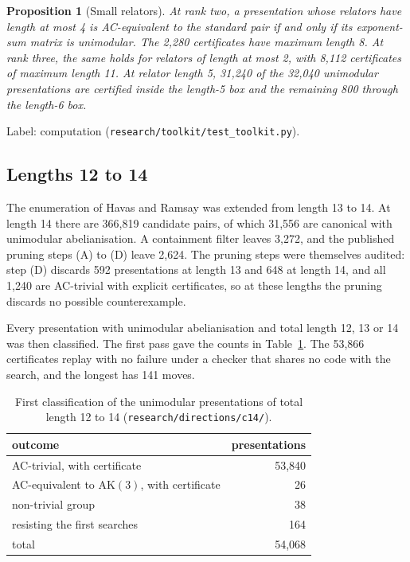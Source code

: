 \documentclass[11pt,a4paper]{article}
\newtheorem{proposition}[theorem]{Proposition}
\theoremstyle{definition}
\newcommand{\AK}{\mathrm{AK}}
\begin{document}
\begin{proposition}[Small relators]\label{prop:small}
At rank two, a presentation whose relators have length at most 4 is AC-equivalent to the standard pair if and only if its exponent-sum matrix is unimodular. The 2,280 certificates have maximum length 8. At rank three, the same holds for relators of length at most 2, with 8,112 certificates of maximum length 11. At relator length 5, 31,240 of the 32,040 unimodular presentations are certified inside the length-5 box and the remaining 800 through the length-6 box.
\end{proposition}

Label: computation (\texttt{research/toolkit/test\_toolkit.py}).

\subsection{Lengths 12 to 14}

The enumeration of Havas and Ramsay was extended from length 13 to 14. At length 14 there are 366,819 candidate pairs, of which 31,556 are canonical with unimodular abelianisation. A containment filter leaves 3,272, and the published pruning steps (A) to (D) leave 2,624. The pruning steps were themselves audited: step (D) discards 592 presentations at length 13 and 648 at length 14, and all 1,240 are AC-trivial with explicit certificates, so at these lengths the pruning discards no possible counterexample.

Every presentation with unimodular abelianisation and total length 12, 13 or 14 was then classified. The first pass gave the counts in Table~\ref{tab:c14first}. The 53,866 certificates replay with no failure under a checker that shares no code with the search, and the longest has 141 moves.

\begin{table}[h]
\centering
\begin{tabular}{lr}
\toprule
outcome & presentations \\
\midrule
AC-trivial, with certificate & 53,840 \\
AC-equivalent to $\AK(3)$, with certificate & 26 \\
non-trivial group & 38 \\
resisting the first searches & 164 \\
\midrule
total & 54,068 \\
\bottomrule
\end{tabular}
\caption{First classification of the unimodular presentations of total length 12 to 14 (\texttt{research/directions/c14/}).}
\label{tab:c14first}
\end{table}
\end{document}
